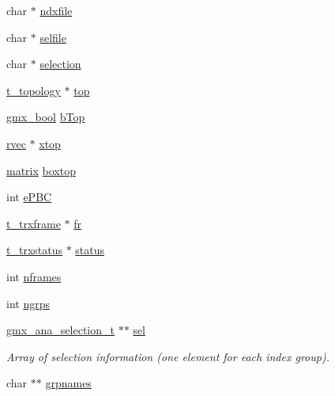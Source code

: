 \begin{DoxyCompactItemize}
\item 
char $\ast$ \hyperlink{structgmx__ana__traj__t_aaf24acfcd21e921088dc2bd12473d616}{ndxfile}
\item 
char $\ast$ \hyperlink{structgmx__ana__traj__t_a81197af632ea1ab077460a3120cffb5b}{selfile}
\item 
char $\ast$ \hyperlink{structgmx__ana__traj__t_ae4f480a1a1c54b77ebbc86aed0a2d691}{selection}
\item 
\hyperlink{structt__topology}{t\-\_\-topology} $\ast$ \hyperlink{structgmx__ana__traj__t_a49e2e4d714fb70040167126a6eb6b0d0}{top}
\item 
\hyperlink{include_2types_2simple_8h_a8fddad319f226e856400d190198d5151}{gmx\-\_\-bool} \hyperlink{structgmx__ana__traj__t_aa53d89f68f5be475433ab4a3c6a3b548}{b\-Top}
\item 
\hyperlink{share_2template_2gromacs_2types_2simple_8h_aa02a552a4abd2f180c282a083dc3a999}{rvec} $\ast$ \hyperlink{structgmx__ana__traj__t_a451264a172bf813c2e3944a2da851005}{xtop}
\item 
\hyperlink{share_2template_2gromacs_2types_2simple_8h_a7ea9c2a830d3f743b887387e33645a83}{matrix} \hyperlink{structgmx__ana__traj__t_a004517c1ffc059544e3b57544b22cd48}{boxtop}
\item 
int \hyperlink{structgmx__ana__traj__t_ac41bbb36db7d48726cc82a6ce6a305b4}{e\-P\-B\-C}
\item 
\hyperlink{include_2types_2trx_8h_a206f77137d72a5db1097a457a7144ad5}{t\-\_\-trxframe} $\ast$ \hyperlink{structgmx__ana__traj__t_a5f85f7e48402dccf3528c557a2392851}{fr}
\item 
\hyperlink{structt__trxstatus}{t\-\_\-trxstatus} $\ast$ \hyperlink{structgmx__ana__traj__t_a00ea8b2f332679818d015c0934ef7aeb}{status}
\item 
int \hyperlink{structgmx__ana__traj__t_a42136ddead4d9928b76591598b9daa2b}{nframes}
\item 
int \hyperlink{structgmx__ana__traj__t_ae37017abad437e0c60648ee122b078cf}{ngrps}
\item 
\hyperlink{structgmx__ana__selection__t}{gmx\-\_\-ana\-\_\-selection\-\_\-t} $\ast$$\ast$ \hyperlink{structgmx__ana__traj__t_a6e4035cd8282c5d0610b327be92b12d3}{sel}
\begin{DoxyCompactList}\small\item\em \-Array of selection information (one element for each index group). \end{DoxyCompactList}\item 
char $\ast$$\ast$ \hyperlink{structgmx__ana__traj__t_a1888caa9f1f2bdfe47247501c6d0216b}{grpnames}

\end{DoxyCompactItemize}
